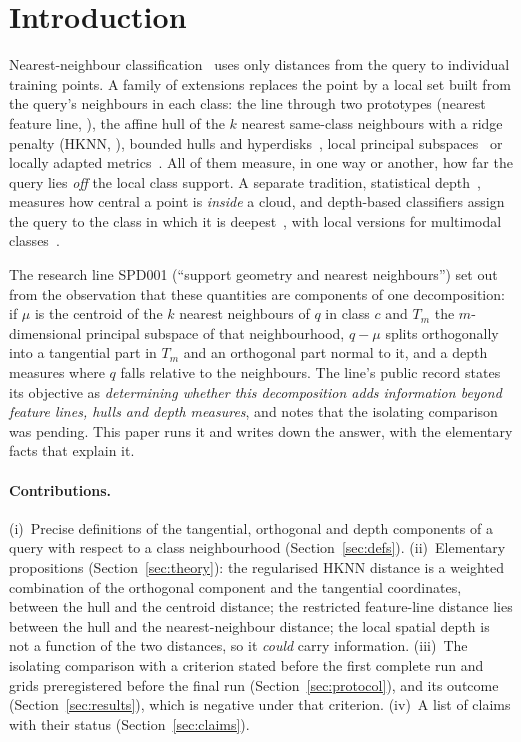 \documentclass[10pt,a4paper]{article}
\theoremstyle{plain}
\theoremstyle{definition}
\theoremstyle{remark}
\begin{document}
\section{Introduction}\label{sec:intro}

Nearest-neighbour classification~\citep{fixhodges1989,coverhart1967} uses only distances from the query to individual training points. A family of extensions replaces the point by a local set built from the query's neighbours in each class: the line through two prototypes (nearest feature line, \citealp{lilu1999}), the affine hull of the $k$ nearest same-class neighbours with a ridge penalty (HKNN, \citealp{vincentbengio2002}), bounded hulls and hyperdisks~\citep{cevikalp2008}, local principal subspaces~\citep{kambhatlaleen1997} or locally adapted metrics~\citep{hastietibshirani1996}. All of them measure, in one way or another, how far the query lies \emph{off} the local class support. A separate tradition, statistical depth~\citep{tukey1975,liu1990,zuoserfling2000}, measures how central a point is \emph{inside} a cloud, and depth-based classifiers assign the query to the class in which it is deepest~\citep{ghoshchaudhuri2005,licuestaliu2012}, with local versions for multimodal classes~\citep{paindaveinevanbever2013}.

The research line SPD001 (``support geometry and nearest neighbours'') set out from the observation that these quantities are components of one decomposition: if $\mu$ is the centroid of the $k$ nearest neighbours of $q$ in class $c$ and $T_m$ the $m$-dimensional principal subspace of that neighbourhood, $q-\mu$ splits orthogonally into a tangential part in $T_m$ and an orthogonal part normal to it, and a depth measures where $q$ falls relative to the neighbours. The line's public record states its objective as \emph{determining whether this decomposition adds information beyond feature lines, hulls and depth measures}, and notes that the isolating comparison was pending. This paper runs it and writes down the answer, with the elementary facts that explain it.

\paragraph{Contributions.} (i)~Precise definitions of the tangential, orthogonal and depth components of a query with respect to a class neighbourhood (Section~\ref{sec:defs}). (ii)~Elementary propositions (Section~\ref{sec:theory}): the regularised HKNN distance is a weighted combination of the orthogonal component and the tangential coordinates, between the hull and the centroid distance; the restricted feature-line distance lies between the hull and the nearest-neighbour distance; the local spatial depth is not a function of the two distances, so it \emph{could} carry information. (iii)~The isolating comparison with a criterion stated before the first complete run and grids preregistered before the final run (Section~\ref{sec:protocol}), and its outcome (Section~\ref{sec:results}), which is negative under that criterion. (iv)~A list of claims with their status (Section~\ref{sec:claims}).
\end{document}
